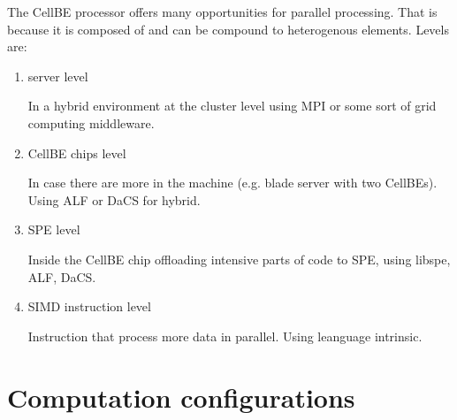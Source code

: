 The CellBE processor offers many opportunities for parallel processing.
That is because it is composed of and can be compound to heterogenous elements.
 Levels are:
\begin{enumerate}
\item server level
\par
In a hybrid environment at the cluster level using MPI or some sort of grid computing middleware.

\item CellBE chips level
\par
In case there are more in the machine (e.g. blade server with two CellBEs). Using ALF or DaCS for hybrid.

\item SPE level
\par
Inside the CellBE chip offloading intensive parts of code to SPE, using libspe, ALF, DaCS.

\item SIMD instruction level
\par
Instruction that process more data in parallel. Using leanguage intrinsic.
\end{enumerate}

\section{Computation configurations}

